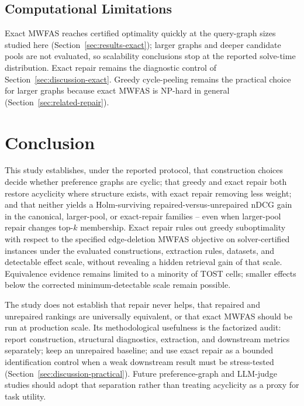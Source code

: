 \documentclass[pdflatex,sn-basic,Numbered]{sn-jnl}
\begin{document}
\subsection{Computational Limitations}
\label{sec:limitations-computational}

Exact MWFAS reaches certified optimality quickly at the query-graph sizes
studied here (Section~\ref{sec:results-exact}); larger graphs and deeper
candidate pools are not evaluated, so scalability conclusions stop at the
reported solve-time distribution. Exact repair remains the diagnostic
control of Section~\ref{sec:discussion-exact}. Greedy cycle-peeling remains
the practical choice for larger graphs because exact MWFAS is NP-hard in
general (Section~\ref{sec:related-repair}).

\section{Conclusion}
\label{sec:conclusion}

This study establishes, under the reported protocol, that construction
choices decide whether preference graphs are cyclic; that greedy and exact
repair both restore acyclicity where structure exists, with exact repair
removing less weight; and that neither yields a Holm-surviving
repaired-versus-unrepaired nDCG gain in the canonical, larger-pool, or
exact-repair families -- even when larger-pool repair changes top-$k$
membership. Exact repair rules out greedy suboptimality with respect to the
specified edge-deletion MWFAS objective on solver-certified instances under
the evaluated constructions, extraction rules, datasets, and detectable
effect scale, without revealing a hidden retrieval gain of that scale.
Equivalence evidence remains limited to a minority of TOST cells; smaller
effects below the corrected minimum-detectable scale remain possible.

The study does not establish that repair never helps, that repaired and
unrepaired rankings are universally equivalent, or that exact MWFAS should
be run at production scale. Its methodological usefulness is the factorized
audit: report construction, structural diagnostics, extraction, and
downstream metrics separately; keep an unrepaired baseline; and use exact
repair as a bounded identification control when a weak downstream result
must be stress-tested (Section~\ref{sec:discussion-practical}). Future
preference-graph and LLM-judge studies should adopt that separation rather
than treating acyclicity as a proxy for task utility.
\end{document}
